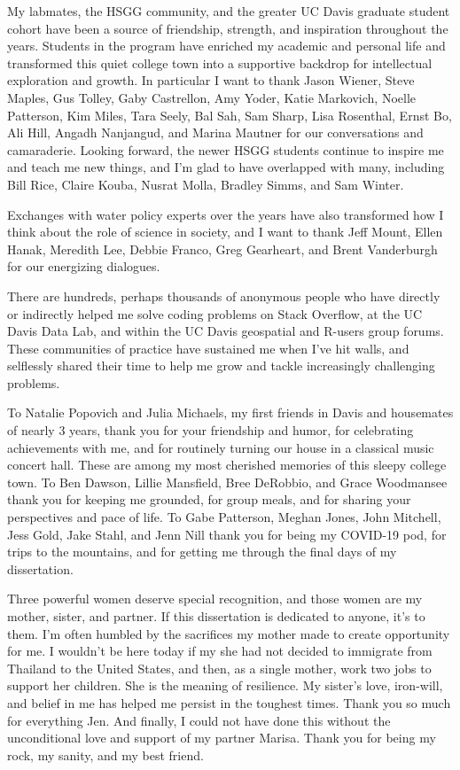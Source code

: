 \begin{frontmatter}
\begin{acknowledgments}
My labmates, the HSGG community, and the greater UC Davis graduate student cohort have been a source of friendship, strength, and inspiration throughout the years. Students in the program have enriched my academic and personal life and transformed this quiet college town into a supportive backdrop for intellectual exploration and growth. In particular I want to thank Jason Wiener, Steve Maples, Gus Tolley, Gaby Castrellon, Amy Yoder, Katie Markovich, Noelle Patterson, Kim Miles, Tara Seely, Bal Sah, Sam Sharp, Lisa Rosenthal, Ernst Bo, Ali Hill, Angadh Nanjangud, and Marina Mautner for our conversations and camaraderie. Looking forward, the newer HSGG students continue to inspire me and teach me new things, and I'm glad to have overlapped with many, including Bill Rice, Claire Kouba, Nusrat Molla, Bradley Simms, and Sam Winter.

Exchanges with water policy experts over the years have also transformed how I think about the role of science in society, and I want to thank Jeff Mount, Ellen Hanak, Meredith Lee, Debbie Franco, Greg Gearheart, and Brent Vanderburgh for our energizing dialogues.

There are hundreds, perhaps thousands of anonymous people who have directly or indirectly helped me solve coding problems on Stack Overflow, at the UC Davis Data Lab, and within the UC Davis geospatial and R-users group forums. These communities of practice have sustained me when I've hit walls, and selflessly shared their time to help me grow and tackle increasingly challenging problems.

To Natalie Popovich and Julia Michaels, my first friends in Davis and housemates of nearly 3 years, thank you for your friendship and humor, for celebrating achievements with me, and for routinely turning our house in a classical music concert hall. These are among my most cherished memories of this sleepy college town. To Ben Dawson, Lillie Mansfield, Bree DeRobbio, and Grace Woodmansee thank you for keeping me grounded, for group meals, and for sharing your perspectives and pace of life. To Gabe Patterson, Meghan Jones, John Mitchell, Jess Gold, Jake Stahl, and Jenn Nill thank you for being my COVID-19 pod, for trips to the mountains, and for getting me through the final days of my dissertation. 

Three powerful women deserve special recognition, and those women are my mother, sister, and partner. If this dissertation is dedicated to anyone, it's to them. I'm often humbled by the sacrifices my mother made to create opportunity for me. I wouldn't be here today if my she had not decided to immigrate from Thailand to the United States, and then, as a single mother, work two jobs to support her children. She is the meaning of resilience. My sister's love, iron-will, and belief in me has helped me persist in the toughest times. Thank you so much for everything Jen. And finally, I could not have done this without the unconditional love and support of my partner Marisa. Thank you for being my rock, my sanity, and my best friend. 






\end{acknowledgments}
\end{frontmatter}
